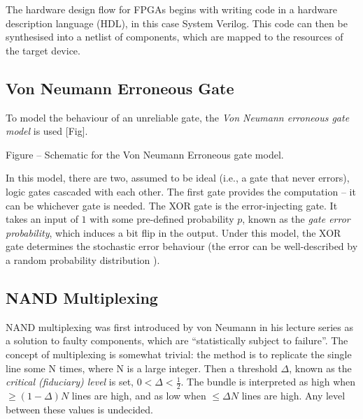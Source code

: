 \noindent The hardware design flow for FPGAs begins with writing code in a hardware description language (HDL), in this case System 
Verilog. This code can then be synthesised into a netlist of components, which are mapped to the resources of the target device.


\subsection{Von Neumann Erroneous Gate}
\label{sec:bgrw-vneg}

\noindent To model the behaviour of an unreliable gate, the \emph{Von Neumann erroneous gate model} is used [Fig]. \\

\begin{center}
Figure -- Schematic for the Von Neumann Erroneous gate model. \\
\end{center}

\noindent In this model, there are two, assumed to be ideal (i.e., a gate that never errors), logic gates cascaded with each other. The 
first gate provides the computation -- it can be whichever gate is needed. The XOR gate is the error-injecting gate. It takes an input of 
$1$ with some pre-defined probability $p$, known as the \emph{gate error probability}, which induces a bit flip in the output. Under this 
model, the XOR gate determines the stochastic error behaviour (the error can be well-described by a random probability distribution 
\cite{pavliotis2014stochastic}).

\subsection{NAND Multiplexing}
\label{sec:bgrw-nand}

\noindent NAND multiplexing was first introduced by von Neumann in his lecture series \cite{vonneumann} as a solution to faulty 
components, which are ``statistically subject to failure''. The concept of multiplexing is somewhat trivial: the method is to replicate 
the single line some N times, where N is a large integer. Then a threshold $\Delta$, known as the \emph{critical (fiduciary) level} is 
set, $0 < \Delta < \frac{1}{2}$. The bundle is interpreted as high when $\geq (1 - \Delta)N$ lines are high, and as low when $\leq \Delta 
N$ lines are high. Any level between these values is undecided. \\

